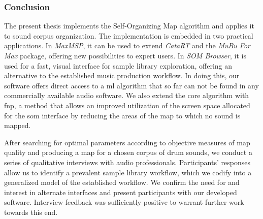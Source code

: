 \subsubsection{Conclusion}
\label{subsubsec:discussion_conclusion}
The present thesis implements the Self-Organizing Map algorithm and applies it
to sound corpus organization. The implementation is embedded in two practical
applications. In \textit{MaxMSP}, it can be used to extend \textit{CataRT} and
the \textit{MuBu For Max} package, offering new possibilities to expert users.
In \textit{SOM Browser}, it is used for a fast, visual interface for
sample library exploration, offering an alternative to the established music
production workflow. In doing this, our software offers direct access to a
\gls{ml} algorithm that so far can not be found in any commercially available
audio software. We also extend the core algorithm with \gls{fnp}, a method that
allows an improved utilization of the screen space allocated for the \gls{som}
interface by reducing the areas of the map to which no sound is mapped.

\smallskip


After searching for optimal parameters according to objective measures of map
quality and producing a map for a chosen corpus of drum sounds, we conduct a
series of qualitative interviews with audio professionals. Participants'
responses allow us to identify a prevalent sample library workflow, which we
codify into a generalized model of the established workflow. We confirm the need
for and interest in alternate interfaces and present participants with our
developed software. Interview feedback was sufficiently positive to warrant
further work towards this end.
